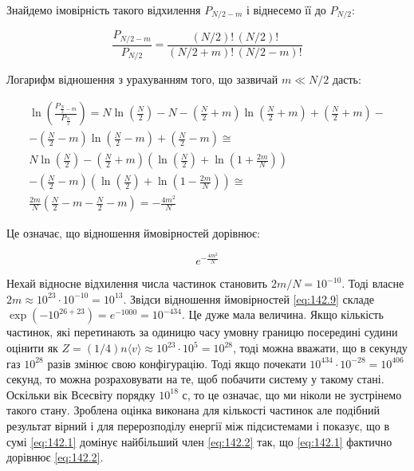Знайдемо імовірність такого відхилення $P_{N/2 - m}$ і віднесемо її до $P_{N/2}$:

\begin{equation}
	\frac{P_{N/2 - m}}{P_{N/2}} = \frac{(N/2)! \, (N/2)!}{(N/2 + m)! \, (N/2 - m)!}
	\label{eq:142.7}
\end{equation}

Логарифм відношення з урахуванням того, що зазвичай $m \ll N/2$ дасть:


\begin{multline}\label{eq:142.8}
	\ln{\left(\frac{P_{\frac{N}{2}-m}}{P_\frac{N}{2}}\right)} = N\ln{\left(\frac{N}{2}\right)} - N - \left(\frac{N}{2}+m\right)\ln{\left(\frac{N}{2}+m\right)} + \left(\frac{N}{2}+m\right) - \\
	- \left(\frac{N}{2}-m\right)\ln{\left(\frac{N}{2}-m\right)} + \left(\frac{N}{2}-m\right) \cong \\
	N\ln{\left(\frac{N}{2}\right)} - \left(\frac{N}{2}+m\right)\left(\ln{\left(\frac{N}{2}\right)} + \ln{\left(1+\frac{2m}{N}\right)}\right) \\
	- \left(\frac{N}{2}-m\right)\left(\ln{\left(\frac{N}{2}\right)} + \ln{\left(1-\frac{2m}{N}\right)}\right) \cong \\
	\frac{2m}{N}\left(\frac{N}{2}-m - \frac{N}{2}-m\right) = -\frac{4m^2}{N}
\end{multline}

Це означає, що відношення ймовірностей дорівнює:

\begin{equation}\label{eq:142.9}
	e^{-\frac{4m^2}{N}}
\end{equation}

Нехай відносне відхилення числа частинок становить $2m/N = 10^{-10}$. Тоді власне $2m \approx 10^{23} \cdot 10^{-10} = 10^{13}$. Звідси відношення ймовірностей \eqref{eq:142.9} складе $\exp(-10^{26 + 23}) = e^{-1000} = 10^{-434}$. Це дуже мала величина. Якщо кількість частинок, які перетинають за одиницю часу умовну границю посередині судини оцінити як $Z = (1/4) n \langle v \rangle \approx 10^{23} \cdot 10^5 = 10^{28}$, тоді можна вважати, що в секунду газ $10^{28}$ разів змінює свою конфігурацію. Тоді якщо почекати $10^{434} \cdot 10^{-28} = 10^{406}$ секунд, то можна розраховувати на те, щоб побачити систему у такому стані. Оскільки вік Всесвіту порядку $10^{18}$ с, то це означає, що ми ніколи не зустрінемо такого стану. Зроблена оцінка виконана для кількості частинок але подібний результат вірний і для перерозподілу енергії між підсистемами і показує, що в сумі \eqref{eq:142.1} домінує найбільший член \eqref{eq:142.2} так, що \eqref{eq:142.1} фактично дорівнює \eqref{eq:142.2}.

